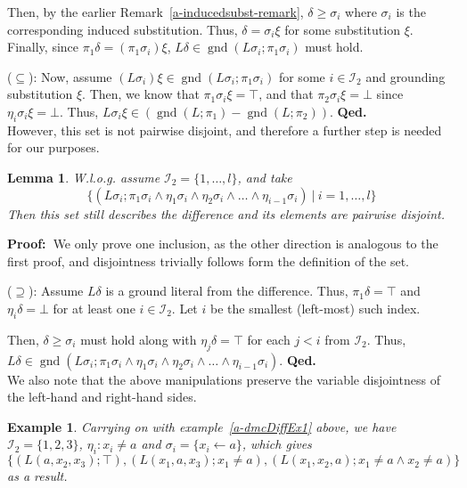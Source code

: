 \documentclass[a4paper]{article}
\newcommand{\mGnd}{\operatorname{gnd}} \newcommand{\mLVar}{\operatorname{lvar}} \newcommand{\mRVar}{\operatorname{rvar}} \newcommand{\mDmn}{\operatorname{dom}} \newcommand{\mRng}{\operatorname{rng}} \newcommand{\mMGU}{\operatorname{mgu}} \newcommand{\mDef}{\operatorname{def}} \newcommand{\mDomain}{\mathcal{D}} \newcommand{\mVar}{\operatorname{var}}
\newcommand{\startproof}{{\bf Proof:~}}
\newcommand{\finishproof}{{\bf Qed.}}
\newtheorem{example}[defi]{Example}
\newtheorem{lemm}[defi]{Lemma}
\begin{document}
Then, by the earlier Remark~\ref{a-inducedsubst-remark}, $\delta \geq  \sigma_i$ where $\sigma_i$ is the corresponding induced substitution. Thus,
$\delta = \sigma_i\xi$ for some substitution $\xi$. 
Finally, since $\pi_1\delta = (\pi_1\sigma_i)\xi$, $L\delta \in \mGnd(L\sigma_i; \pi_1\sigma_i)$ must hold.

($\subseteq$): Now, assume $(L\sigma_i)\xi \in \mGnd(L\sigma_i; \pi_1\sigma_i)$ 
for some $i \in \mathcal{I}_2$ and grounding substitution $\xi$.
Then, we know that $\pi_1\sigma_i\xi = \top$, and that $\pi_2\sigma_i\xi = \bot$ since $\eta_i\sigma_i\xi = \bot$.
Thus, $L\sigma_i\xi \in (\mGnd(L; \pi_1) - \mGnd(L; \pi_2))$.
\finishproof\\[6 pt]
\noindent
However, this set is not pairwise disjoint, and therefore a further step is needed for our purposes.

\begin{lemm}\label{diffLemma2}
W.l.o.g. assume $\mathcal{I}_2 = \{1, \dots, l\}$, and take
\[\{ (L\sigma_i; \pi_1\sigma_i \land \eta_1\sigma_i \land \eta_2\sigma_i \land \dots \land \eta_{i-1}\sigma_i)~|~i = 1, \dots, l\}\]
Then this set still describes the difference and its elements are pairwise disjoint.
\end{lemm}

\noindent
\startproof We only prove one inclusion, as the other direction is analogous to the first proof, and 
disjointness trivially follows form the definition of the set.

($\supseteq$): Assume $L\delta$ is a ground literal from the difference. Thus, $\pi_1\delta = \top$ and 
$\eta_i\delta = \bot$ for at least one $i \in \mathcal{I}_2$. Let $i$ be the smallest (left-most) such index.

Then, $\delta \geq \sigma_i$ must hold along with $\eta_j\delta = \top$ for each $j < i$ from $\mathcal{I}_2$. Thus,
$L\delta \in \mGnd(L\sigma_i; \pi_1\sigma_i \land \eta_1\sigma_i \land \eta_2\sigma_i \land \dots \land \eta_{i-1}\sigma_i)$.
\finishproof\\[6 pt]
\indent
We also note that the above manipulations preserve the variable disjointness of the left-hand and right-hand sides.

\begin{example}
Carrying on with example~\ref{a-dmcDiffEx1} above, we have $\mathcal{I}_2 = \{ 1, 2, 3\}$, $\eta_i: x_i \ne a$ and $\sigma_i = \{ x_i \gets a\}$, which gives
\[\{ (L(a, x_2, x_3); \top), (L(x_1,a, x_3); x_1 \ne a), (L(x_1, x_2, a); x_1 \ne a \land x_2 \ne a)\}\]
as a result.
\end{example}
\end{document}
